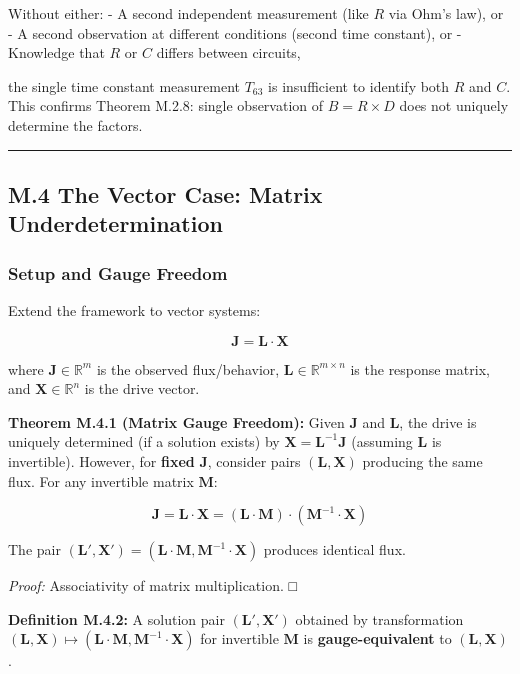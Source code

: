 \documentclass[
]{article}
\begin{document}
Without either: - A second independent measurement (like \(R\) via Ohm's
law), or - A second observation at different conditions (second time
constant), or - Knowledge that \(R\) or \(C\) differs between circuits,

the single time constant measurement \(T_{63}\) is insufficient to
identify both \(R\) and \(C\). This confirms Theorem M.2.8: single
observation of \(B = R \times D\) does not uniquely determine the
factors.

\begin{center}\rule{0.5\linewidth}{0.5pt}\end{center}

\subsection{M.4 The Vector Case: Matrix
Underdetermination}\label{m.4-the-vector-case-matrix-underdetermination}

\subsubsection{Setup and Gauge Freedom}\label{setup-and-gauge-freedom}

Extend the framework to vector systems:

\[\mathbf{J} = \mathbf{L} \cdot \mathbf{X}\]

where \(\mathbf{J} \in \mathbb{R}^m\) is the observed flux/behavior,
\(\mathbf{L} \in \mathbb{R}^{m \times n}\) is the response matrix, and
\(\mathbf{X} \in \mathbb{R}^n\) is the drive vector.

\textbf{Theorem M.4.1 (Matrix Gauge Freedom):} Given \(\mathbf{J}\) and
\(\mathbf{L}\), the drive is uniquely determined (if a solution exists)
by \(\mathbf{X} = \mathbf{L}^{-1} \mathbf{J}\) (assuming \(\mathbf{L}\)
is invertible). However, for \textbf{fixed} \(\mathbf{J}\), consider
pairs \((\mathbf{L}, \mathbf{X})\) producing the same flux. For any
invertible matrix \(\mathbf{M}\):

\[\mathbf{J} = \mathbf{L} \cdot \mathbf{X} = (\mathbf{L} \cdot \mathbf{M}) \cdot (\mathbf{M}^{-1} \cdot \mathbf{X})\]

The pair
\((\mathbf{L}', \mathbf{X}') = (\mathbf{L} \cdot \mathbf{M}, \mathbf{M}^{-1} \cdot \mathbf{X})\)
produces identical flux.

\emph{Proof:} Associativity of matrix multiplication. □

\textbf{Definition M.4.2:} A solution pair
\((\mathbf{L}', \mathbf{X}')\) obtained by transformation
\((\mathbf{L}, \mathbf{X}) \mapsto (\mathbf{L} \cdot \mathbf{M}, \mathbf{M}^{-1} \cdot \mathbf{X})\)
for invertible \(\mathbf{M}\) is \textbf{gauge-equivalent} to
\((\mathbf{L}, \mathbf{X})\).
\end{document}
